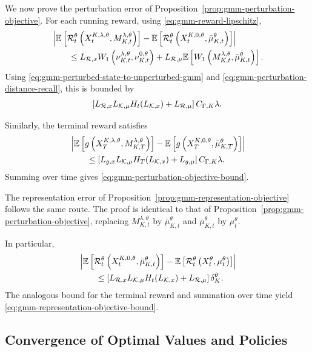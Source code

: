 We now prove the perturbation error of Proposition~\ref{prop:gmm-perturbation-objective}.
For each running reward, using \eqref{eq:gmm-reward-lipschitz},
\begin{align}
    & \left| \mathbb{E} \left[ {\cal R}_t^\theta \left( X_t^{K,\lambda,\theta}, M_{K,t}^{\lambda,\theta} \right) \right] - \mathbb{E} \left[ {\cal R}_t^\theta \left( X_t^{K,0,\theta}, \bar\mu_{K,t}^\theta \right) \right] \right| \nonumber\\
    &\qquad\leq L_{{\cal R},x} W_1 \left( \nu_{K,t}^{\lambda,\theta}, \nu_{K,t}^{0,\theta} \right) + L_{{\cal R},\mu} \mathbb{E} \left[ W_1 \left( M_{K,t}^{\lambda,\theta}, \bar\mu_{K,t}^\theta \right) \right].
\end{align}
Using \eqref{eq:gmm-perturbed-state-to-unperturbed-gmm} and \eqref{eq:gmm-perturbation-distance-recall}, this is bounded by
\begin{align}
    \left[ L_{{\cal R},x} L_{{\cal K},\mu} H_t(L_{{\cal K},x}) + L_{{\cal R},\mu} \right] C_{\Gamma,K}\lambda.
\end{align}

Similarly, the terminal reward satisfies
\begin{align}
    & \left| \mathbb{E} \left[ g \left( X_T^{K,\lambda,\theta}, M_{K,T}^{\lambda,\theta} \right) \right] - \mathbb{E} \left[ g \left( X_T^{K,0,\theta}, \bar\mu_{K,T}^\theta \right) \right] \right| \\
    &\qquad\leq \left[ L_{g,x} L_{{\cal K},\mu} H_T(L_{{\cal K},x}) + L_{g,\mu} \right] C_{\Gamma,K}\lambda.
\end{align}
Summing over time gives \eqref{eq:gmm-perturbation-objective-bound}.

The representation error of Proposition~\ref{prop:gmm-representation-objective} follows the same route.
The proof is identical to that of Proposition~\ref{prop:gmm-perturbation-objective}, replacing $M_{K,t}^{\lambda,\theta}$ by $\bar\mu_{K,t}^\theta$ and $\bar\mu_{K,t}^\theta$ by $\mu_t^\theta$.

In particular,
\begin{align}
    & \left| \mathbb{E} \left[ {\cal R}_t^\theta \left( X_t^{K,0,\theta}, \bar\mu_{K,t}^\theta \right) \right] - \mathbb{E} \left[ {\cal R}_t^\theta \left( X_t^\theta, \mu_t^\theta \right) \right] \right| \\
    &\qquad\leq \left[ L_{{\cal R},x} L_{{\cal K},\mu} H_t(L_{{\cal K},x}) + L_{{\cal R},\mu} \right] \delta_K^\theta.
\end{align}
The analogous bound for the terminal reward and summation over time yield \eqref{eq:gmm-representation-objective-bound}.

\subsection{Convergence of Optimal Values and Policies}
\label{appendix:gmm-optimizer-proofs}

